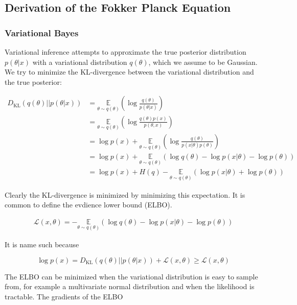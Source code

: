 \documentclass{ucetd}
\begin{document}
\begin{appendices}
\chapter{Derivation of the Fokker Planck Equation}

\subsection{Variational Bayes}

Variational inference attempts to approximate the true posterior distribution $p(\theta|x)$ with a variational distribution $q(\theta)$, which we assume to be Gaussian. We try to minimize the KL-divergence between the variational distribution and the true posterior:

\begin{align*}
D_{\mathrm{KL}}(q(\theta)||p(\theta|x)) &= \underset{{\theta \sim q(\theta)}}{\mathbb{E}}\left(\log\frac{q(\theta)}{p(\theta|x)}\right)\\
&=  \underset{{\theta \sim q(\theta)}}{\mathbb{E}}\left(\log\frac{q(\theta)p(x)}{p(\theta,x)}\right)\\
&=  \log p(x) + \underset{{\theta \sim q(\theta)}}{\mathbb{E}}\left(\log\frac{q(\theta)}{p(x|\theta)p(\theta)}\right)\\
&= \log p(x) + \underset{{\theta \sim q(\theta)}}{\mathbb{E}}\left(\log q(\theta) - \log p(x|\theta) - \log p(\theta) \right)\\
&= \log p(x) + H(q) -\underset{{\theta \sim q(\theta)}}{\mathbb{E}}\left(\log p(x|\theta) + \log p(\theta) \right)
\end{align*}

Clearly the KL-divergence is minimized by minimizing this expectation. It is common to define the evdience lower bound (ELBO).

\begin{align*}
\mathcal{L}(x,\theta) = - \underset{{\theta \sim q(\theta)}}{\mathbb{E}}\left(\log q(\theta) - \log p(x|\theta) - \log p(\theta) \right)
\end{align*}

It is name such because

\begin{equation*}
\log p(x) = D_{\mathrm{KL}}(q(\theta)||p(\theta|x)) + \mathcal{L}(x,\theta) \geq \mathcal{L}(x,\theta)
\end{equation*}

The ELBO can be minimized when the variational distribution is easy to sample from, for example a multivariate normal distribution and when the likelihood is tractable. The gradients of the ELBO


\end{appendices}
\end{document}

